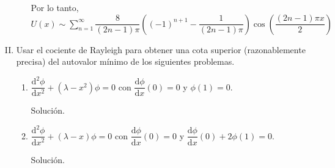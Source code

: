 \documentclass[fleqn]{article}
\newcommand{\despar}[3]{\dfrac{\mathrm{d}^#1 #2}{\mathrm{d} #3^#1}}
\newcommand{\depar}[2]{\dfrac{\mathrm{d} #1}{\mathrm{d} #2}}
\begin{document}
\begin{enumerate}[I.]
\begin{enumerate}
            Por lo tanto, $ U(x) \sim \displaystyle \sum_{n=1}^{\infty}\dfrac{8}{(2n - 1) \pi} \left( (-1)^{n+1} - \dfrac{1}{(2n - 1) \pi} \right) \cos \left( \dfrac{(2n - 1) \pi x}{2} \right) $

		\end{enumerate}
		

		\bfseries
			
		\item Usar el cociente de Rayleigh para obtener una cota superior (razonablemente precisa) del autovalor mínimo de los siguientes problemas.
		
		\begin{enumerate}
			\item $ \despar{2}{\phi}{x} + (\lambda - x^2) \phi = 0 $ con $ \depar{\phi}{x} (0) = 0 $ y $ \phi (1) = 0 $.
			
			Solución.
			
			\normalfont




			\bfseries
			
			\item $ \despar{2}{\phi}{x} + (\lambda - x) \phi = 0 $ con $ \depar{\phi}{x} (0) = 0 $ y $ \depar{\phi}{x} (0) + 2 \phi (1) = 0 $.
			
			Solución.
			
			\normalfont



		\end{enumerate}
	\end{enumerate}
\end{document}
